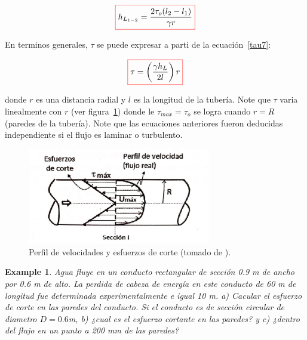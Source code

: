 \documentclass[10pt, oneside]{article}
\newtheorem{exa}{Example}
\begin{document}
\begin{equation}
\color{red}\boxed{\color{black} h_{L_{1-2}} = \frac{2\tau_o (l_2 - l_1 )}{\gamma r} } 
\label{tau7}
\end{equation}

En terminos generales,  $\tau$ se puede expresar a parti de la ecuaci\'on~\ref{tau7}:
 
\begin{equation}
\color{red}\boxed{\color{black} \tau = \left( \frac{\gamma h_L }{2l} \right)r }
\label{tau8}
\end{equation}

donde $r$ es una distancia radial y $l$ es la longitud de la tuber\'ia. Note que $\tau$ varia linealmente con $r$ (ver figura~\ref{taun}) donde le $\tau_{max} = \tau_o$ se logra cuando $r=R$ (paredes de la tuber\'ia). Note que las ecuaciones anteriores fueron deducidas independiente si el flujo es laminar o turbulento.  

\begin{figure}[h]
\centering
\includegraphics[width=8cm]{taun.jpeg}
\caption{Perfil de velocidades y esfuerzos de corte (tomado de \cite{agudelo2011mecanica}).}
\label{taun}
\end{figure}


\begin{shaded}
\begin{exa}
Agua fluye en un conducto rectangular de secci\'on 0.9 m de ancho por 0.6 m de alto. La perdida de cabeza de energ\'ia en este conducto de 60 m de longitud fue determinada experimentalmente e igual 10 m. a) Cacular el esfuerzo de corte en las paredes del conducto. Si el conducto es de secci\'on circular de diametro $D = 0.6$m, b) ¿cual es el esfuerzo cortante en las paredes? y c) ¿dentro del flujo en un punto a 200 mm de las paredes?
\end{exa}
\end{shaded}

\end{document}
